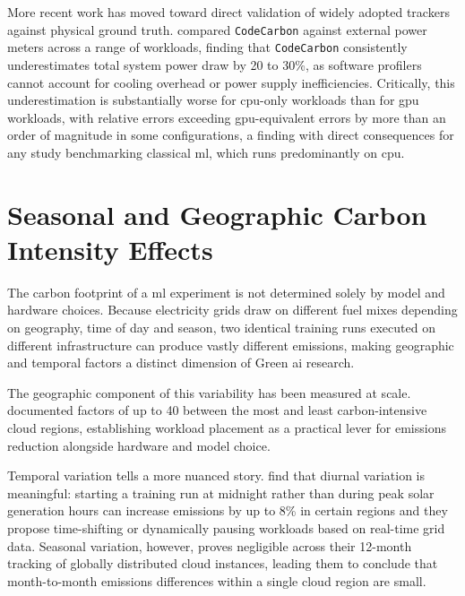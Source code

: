 More recent work has moved toward direct validation of widely adopted trackers against physical ground truth. \citeauthor{fischerGroundTruthingAIEnergy2025} \cite{fischerGroundTruthingAIEnergy2025} compared \texttt{CodeCarbon} against external power meters across a range of workloads, finding that \texttt{CodeCarbon} consistently underestimates total system power draw by 20 to 30\%, as software profilers cannot account for cooling overhead or power supply inefficiencies. Critically, this underestimation is substantially worse for \gls{cpu}-only workloads than for \gls{gpu} workloads, with relative errors exceeding \gls{gpu}-equivalent errors by more than an order of magnitude in some configurations, a finding with direct consequences for any study benchmarking classical \gls{ml}, which runs predominantly on \gls{cpu}.

\section{Seasonal and Geographic Carbon Intensity Effects}
\label{sec:related_carbon_intensity}

The carbon footprint of a \gls{ml} experiment is not determined solely by model and hardware choices. Because electricity grids draw on different fuel mixes depending on geography, time of day and season, two identical training runs executed on different infrastructure can produce vastly different emissions, making geographic and temporal factors a distinct dimension of Green \gls{ai} research.

The geographic component of this variability has been measured at scale. \citeauthor{dodgeMeasuringCarbonIntensity2022} \cite{dodgeMeasuringCarbonIntensity2022} documented factors of up to 40 between the most and least carbon-intensive cloud regions, establishing workload placement as a practical lever for emissions reduction alongside hardware and model choice.

Temporal variation tells a more nuanced story. \citeauthor{dodgeMeasuringCarbonIntensity2022} \cite{dodgeMeasuringCarbonIntensity2022} find that diurnal variation is meaningful: starting a training run at midnight rather than during peak solar generation hours can increase emissions by up to 8\% in certain regions and they propose time-shifting or dynamically pausing workloads based on real-time grid data. Seasonal variation, however, proves negligible across their 12-month tracking of globally distributed cloud instances, leading them to conclude that month-to-month emissions differences within a single cloud region are small.

